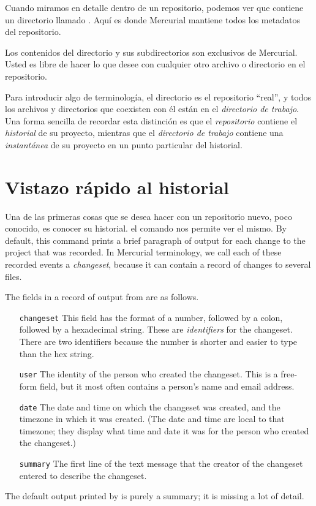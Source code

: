 Cuando miramos en detalle dentro de un repositorio, podemos ver que
contiene un directorio llamado . Aquí es donde Mercurial
mantiene todos los metadatos del repositorio.

Los contenidos del directorio  y sus subdirectorios son
exclusivos de Mercurial. Usted es libre de hacer lo que desee con
cualquier otro archivo o directorio en el repositorio.

Para introducir algo de terminología, el directorio  es
el repositorio ``real'', y todos los archivos y directorios que
coexisten con él están en el \emph{directorio de trabajo}. Una forma
sencilla de recordar esta distinción es que el \emph{repositorio}
contiene el \emph{historial} de su proyecto, mientras que el
\emph{directorio de trabajo} contiene una \emph{instantánea} de su
proyecto en un punto particular del historial.

\section{Vistazo rápido al historial}

Una de las primeras cosas que se desea hacer con un repositorio nuevo,
poco conocido, es conocer su historial. el comando  nos
permite ver el mismo.
By default, this command prints a brief paragraph of output for each
change to the project that was recorded.  In Mercurial terminology, we
call each of these recorded events a \emph{changeset}, because it can
contain a record of changes to several files.

The fields in a record of output from  are as follows.
\begin{itemize}
\item[\texttt{changeset}] This field has the format of a number,
  followed by a colon, followed by a hexadecimal string.  These are
  \emph{identifiers} for the changeset.  There are two identifiers
  because the number is shorter and easier to type than the hex
  string.
\item[\texttt{user}] The identity of the person who created the
  changeset.  This is a free-form field, but it most often contains a
  person's name and email address.
\item[\texttt{date}] The date and time on which the changeset was
  created, and the timezone in which it was created.  (The date and
  time are local to that timezone; they display what time and date it
  was for the person who created the changeset.)
\item[\texttt{summary}] The first line of the text message that the
  creator of the changeset entered to describe the changeset.
\end{itemize}
The default output printed by  is purely a summary; it is
missing a lot of detail.

